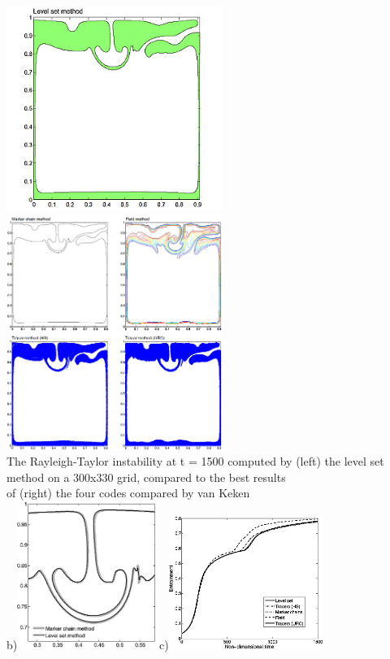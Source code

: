 \begin{itemize}
\begin{center}
\includegraphics[width=7cm]{images/benchmark_vaks97/sunh10_a}
\includegraphics[width=7cm]{images/benchmark_vaks97/sunh10_e}\\
{\captionfont The Rayleigh‐Taylor instability at t = 1500 computed by (left) 
the level set method on a 300x330 grid, compared to the best results\\ 
of (right) the four codes compared by van Keken \etal }\\
b)\includegraphics[width=4.5cm]{images/benchmark_vaks97/sunh10_b}
c)\includegraphics[width=5cm]{images/benchmark_vaks97/sunh10_c}

\end{center}
\end{itemize}
